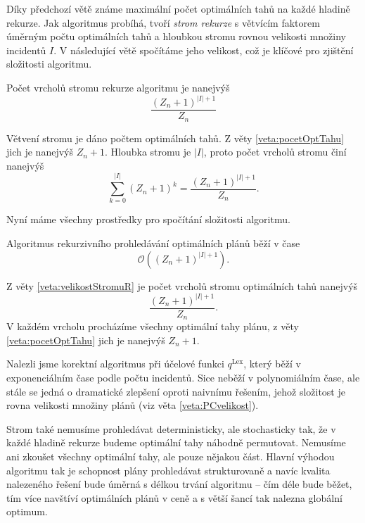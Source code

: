 Díky předchozí větě známe maximální počet optimálních tahů na každé hladině rekurze. Jak algoritmus probíhá,
tvoří \textit{strom rekurze} s větvícím faktorem úměrným počtu optimálních tahů a hloubkou stromu rovnou velikosti množiny incidentů $I$.
V následující větě spočítáme jeho velikost, což je klíčové pro zjištění složitosti algoritmu.
\begin{veta}\label{veta:velikostStromuR}
Počet vrcholů stromu rekurze algoritmu je nanejvýš
  \begin{equation*}
    \frac{(Z_n + 1)^{|I| + 1}}{Z_n}
  \end{equation*}
\end{veta}
\begin{dukaz}
  Větvení stromu je dáno počtem optimálních tahů.
  Z věty \ref{veta:pocetOptTahu} jich je nanejvýš $Z_n + 1$.
  Hloubka stromu je $|I|$, proto
  počet vrcholů stromu činí nanejvýš
  \begin{equation*}
    \sum_{k=0}^{|I|} (Z_n + 1)^{k} = \frac{(Z_n + 1)^{|I| + 1}}{Z_n}.
  \end{equation*}
\end{dukaz}

Nyní máme všechny prostředky pro spočítání složitosti algoritmu.
\begin{veta}\label{veta:slozitostRek}
  Algoritmus rekurzivního prohledávání optimálních plánů běží v čase
  \begin{equation*}
    \mathcal{O}((Z_n + 1)^{|I| + 1}).
  \end{equation*}
\end{veta}
\begin{dukaz}
  Z věty \ref{veta:velikostStromuR} je počet vrcholů stromu optimálních tahů nanejvýš
  \begin{equation*}
    \frac{(Z_n + 1)^{|I| + 1}}{Z_n}.
  \end{equation*}
  V každém vrcholu procházíme všechny optimální tahy plánu, z věty \ref{veta:pocetOptTahu} jich je nanejvýš $Z_n + 1$.
\end{dukaz}

Nalezli jsme korektní algoritmus při účelové funkci $q^{\text{Lex}}$, který běží v exponenciálním čase podle počtu incidentů. 
Sice neběží v polynomiálním čase, ale stále se jedná o dramatické zlepšení oproti naivnímu řešením, jehož složitost je rovna velikosti množiny plánů (viz věta \ref{veta:PCvelikost}).

Strom také nemusíme prohledávat deterministicky, ale stochasticky tak, že v každé hladině rekurze budeme optimální tahy náhodně permutovat. Nemusíme ani zkoušet všechny optimální tahy,
ale pouze nějakou část. Hlavní výhodou algoritmu tak je schopnost plány prohledávat strukturovaně a navíc kvalita nalezeného řešení bude úměrná s délkou trvání algoritmu
-- čím déle bude běžet, tím více navštíví optimálních plánů v ceně a s větší šancí tak nalezna globální optimum.

